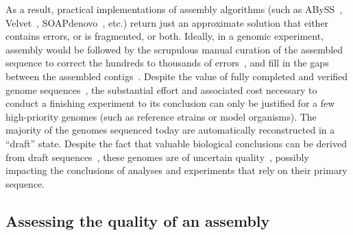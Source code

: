 \documentclass[12pt,\mydriver]{thesis}
\begin{document}
As a result, practical implementations of assembly algorithms (such as
ABySS~\cite{ABySS}, Velvet~\cite{Velvet},
SOAPdenovo~\cite{li2010novo}, etc.) return just an approximate
solution that either contains errors, or is fragmented, or both.
Ideally, in a genomic experiment, assembly would be followed by the
scrupulous manual curation of the assembled sequence to correct the
hundreds to thousands of errors~\cite{salzberg2005misassemblies}, and
fill in the gaps between the assembled
contigs~\cite{nagarajan2010finishing}. Despite the value of fully
completed and verified genome sequences~\cite{fraser2002value}, the
substantial effort and associated cost necessary to conduct a
finishing experiment to its conclusion can only be justified for a
few high-priority genomes (such as reference strains or model
organisms). The majority of the genomes sequenced today are
automatically reconstructed in a ``draft'' state.  Despite the fact
that valuable biological conclusions can be derived from draft
sequences~\cite{branscomb2002high}, these genomes are of uncertain
quality~\cite{chain2009genome}, possibly impacting the conclusions of
analyses and experiments that rely on their primary sequence.

\subsection{Assessing the quality of an assembly}
\end{document}
